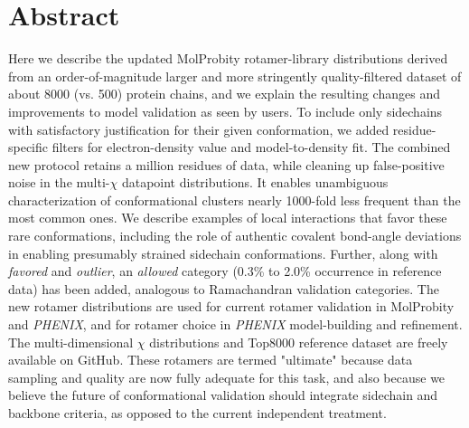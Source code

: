 \section{Abstract}

Here we describe the updated MolProbity rotamer-library distributions derived from an order-of-magnitude larger and more stringently quality-filtered dataset of about 8000 (vs. 500) protein chains, and we explain the resulting changes and improvements to model validation as seen by users. To include only sidechains with satisfactory justification for their given conformation, we added residue-specific filters for electron-density value and model-to-density fit.  The combined new protocol retains a million residues of data, while cleaning up \textcolor{changecolor}{false-positive} noise in the multi-$\chi$ \textcolor{changecolor}{datapoint} distributions.  It enables \textcolor{changecolor}{unambiguous} characterization of conformational clusters nearly 1000-fold less frequent than the most common ones.  We describe examples of local interactions that favor these rare conformations, including the role of authentic covalent bond-angle deviations in enabling presumably strained sidechain conformations. Further, along with \textit{favored} and \textit{outlier}, an \textit{allowed} category (0.3\% to 2.0\% occurrence in reference data) has been added, analogous to Ramachandran validation categories. The new rotamer distributions are used for current rotamer validation in MolProbity and \textit{PHENIX}, and for rotamer choice in \textit{PHENIX} model-building and refinement. The multi-dimensional $\chi$ distributions and Top8000 reference dataset are freely available on GitHub. These rotamers are termed "ultimate" because data sampling and quality are now fully adequate for this task, and also because we believe the future of conformational validation should integrate sidechain and backbone \textcolor{changecolor}{criteria, as opposed to the current independent treatment}.
